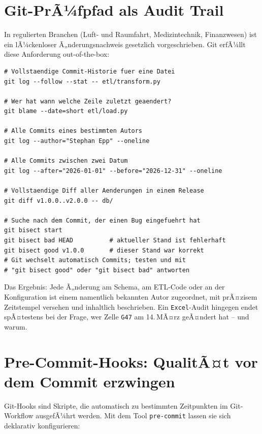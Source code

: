 ﻿\documentclass[12pt,a4paper]{report}
\theoremstyle{definition}
\theoremstyle{remark}
\newcommand{\excel}{\texttt{Excel}}
\newcommand{\code}[1]{\texttt{#1}}
\begin{document}
\section{Git-PrÃ¼fpfad als Audit Trail}

In regulierten Branchen (Luft- und Raumfahrt, Medizintechnik,
Finanzwesen) ist ein lÃ¼ckenloser Ã„nderungsnachweis gesetzlich
vorgeschrieben. Git erfÃ¼llt diese Anforderung out-of-the-box:

\begin{lstlisting}[style=bash, caption={Audit-Trail-Abfragen mit Git}]
# Vollstaendige Commit-Historie fuer eine Datei
git log --follow --stat -- etl/transform.py

# Wer hat wann welche Zeile zuletzt geaendert?
git blame --date=short etl/load.py

# Alle Commits eines bestimmten Autors
git log --author="Stephan Epp" --oneline

# Alle Commits zwischen zwei Datum
git log --after="2026-01-01" --before="2026-12-31" --oneline

# Vollstaendige Diff aller Aenderungen in einem Release
git diff v1.0.0..v2.0.0 -- db/

# Suche nach dem Commit, der einen Bug eingefuehrt hat
git bisect start
git bisect bad HEAD          # aktueller Stand ist fehlerhaft
git bisect good v1.0.0       # dieser Stand war korrekt
# Git wechselt automatisch Commits; testen und mit
# "git bisect good" oder "git bisect bad" antworten
\end{lstlisting}

Das Ergebnis: Jede Ã„nderung am Schema, am ETL-Code oder an der
Konfiguration ist einem namentlich bekannten Autor zugeordnet,
mit prÃ¤zisem Zeitstempel versehen und inhaltlich beschrieben.
Ein \excel-Audit hingegen endet spÃ¤testens bei der Frage,
wer Zelle \code{G47} am 14.\,MÃ¤rz geÃ¤ndert hat -- und warum.

\section{Pre-Commit-Hooks: QualitÃ¤t vor dem Commit erzwingen}

Git-Hooks sind Skripte, die automatisch zu bestimmten Zeitpunkten
im Git-Workflow ausgefÃ¼hrt werden. Mit dem Tool \code{pre-commit}
lassen sie sich deklarativ konfigurieren:
\end{document}
